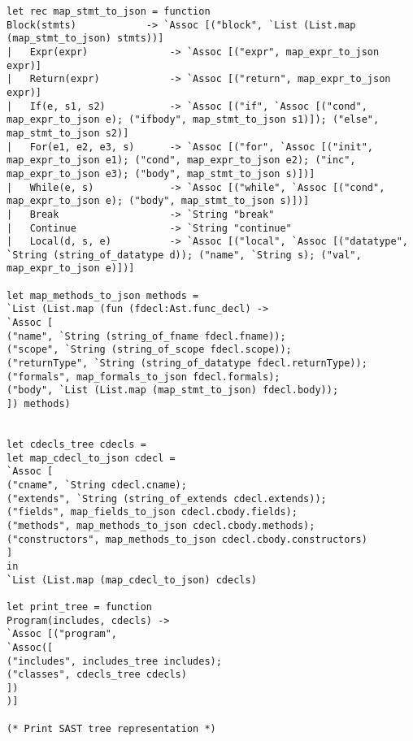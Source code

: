\begin{verbatim}
let rec map_stmt_to_json = function
Block(stmts) 			-> `Assoc [("block", `List (List.map (map_stmt_to_json) stmts))]
| 	Expr(expr) 				-> `Assoc [("expr", map_expr_to_json expr)]
| 	Return(expr) 			-> `Assoc [("return", map_expr_to_json expr)]
| 	If(e, s1, s2) 			-> `Assoc [("if", `Assoc [("cond", map_expr_to_json e); ("ifbody", map_stmt_to_json s1)]); ("else", map_stmt_to_json s2)]
| 	For(e1, e2, e3, s) 		-> `Assoc [("for", `Assoc [("init", map_expr_to_json e1); ("cond", map_expr_to_json e2); ("inc", map_expr_to_json e3); ("body", map_stmt_to_json s)])]
| 	While(e, s) 			-> `Assoc [("while", `Assoc [("cond", map_expr_to_json e); ("body", map_stmt_to_json s)])]
|  	Break					-> `String "break"
|  	Continue				-> `String "continue"
|   Local(d, s, e) 			-> `Assoc [("local", `Assoc [("datatype", `String (string_of_datatype d)); ("name", `String s); ("val", map_expr_to_json e)])]

let map_methods_to_json methods = 
`List (List.map (fun (fdecl:Ast.func_decl) -> 
`Assoc [
("name", `String (string_of_fname fdecl.fname));
("scope", `String (string_of_scope fdecl.scope));
("returnType", `String (string_of_datatype fdecl.returnType));
("formals", map_formals_to_json fdecl.formals);
("body", `List (List.map (map_stmt_to_json) fdecl.body));
]) methods)


let cdecls_tree cdecls =
let map_cdecl_to_json cdecl = 
`Assoc [
("cname", `String cdecl.cname);
("extends", `String (string_of_extends cdecl.extends));
("fields", map_fields_to_json cdecl.cbody.fields);
("methods", map_methods_to_json cdecl.cbody.methods);
("constructors", map_methods_to_json cdecl.cbody.constructors)
]
in
`List (List.map (map_cdecl_to_json) cdecls)

let print_tree = function
Program(includes, cdecls) -> 
`Assoc [("program", 
`Assoc([
("includes", includes_tree includes);
("classes", cdecls_tree cdecls)
])
)]

(* Print SAST tree representation *)


\end{verbatim}

